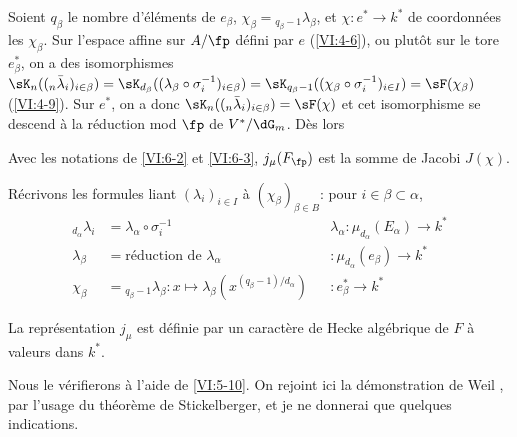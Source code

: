 Soient $q_\beta$ le nombre d'éléments de $e_\beta$, 
$\chi_\beta={}_{q_\beta-1}\lambda_\beta$, et 
$\chi:e^\ast \to k^\ast$ de coordonnées les $\chi_\beta$. Sur l'espace 
affine sur $A/\fp$ défini par $e$ (\ref{VI:4-6}), ou plutôt sur le tore 
$e_\beta^\ast$, on a des isomorphismes 
$\sK_n((_n\bar\lambda_i)_{i\in\beta}) = \sK_{d_\beta}((\lambda_\beta \circ \sigma_i^{-1})_{i\in\beta}) =\sK_{q_\beta-1}((\chi_\beta\circ \sigma_i^{-1})_{i\in I}) = \sF(\chi_\beta)$ (\ref{VI:4-9}). 
Sur $e^\ast$, on a donc $\sK_n((_n\bar\lambda_i)_{i\in \beta}) = \sF(\chi)$ 
et cet isomorphisme se descend à la réduction mod $\fp$ de $V^\ast/\dG_m$. 
Dès lors





\begin{proposition_}\label{VI:6-4}
Avec les notations de \ref{VI:6-2} et \ref{VI:6-3}, $j_\mu(F_\fp)$ est la 
somme de Jacobi $J(\chi)$. 
\end{proposition_}

Récrivons les formules liant $(\lambda_i)_{i\in I}$ à 
$(\chi_\beta)_{\beta\in B}$: pour $i\in \beta\subset \alpha$, 
\begin{align*}
  _{d_\alpha} \lambda_i &= \lambda_\alpha\circ \sigma_i^{-1} && \lambda_\alpha:\mu_{d_\alpha}(E_\alpha) \to k^\ast \\
  \lambda_\beta &= \text{réduction de $\lambda_\alpha$} && :\mu_{d_\alpha}(e_\beta) \to k^\ast \\
  \chi_\beta &= {}_{q_\beta-1}\lambda_\beta: x\mapsto \lambda_\beta(x^{(q_\beta-1)/d_\alpha}) && :e_\beta^\ast \to k^\ast 
\end{align*}





\begin{theorem_}\label{VI:6-5}
La représentation $j_\mu$ est définie par un caractère de Hecke 
algébrique de $F$ à valeurs dans $k^\ast$. 
\end{theorem_}

Nous le vérifierons à l'aide de \ref{VI:5-10}. On rejoint ici la 
démonstration de Weil \cite{we52,we74-2}, par l'usage du théorème de 
Stickelberger, et je ne donnerai que quelques indications. 





\subsection{}\label{VI:6-6}

